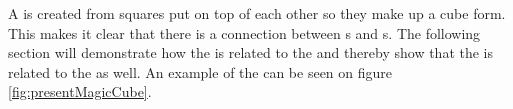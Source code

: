 \begin{comment}
The proof of this formula is quite straightforward. As table \ref{tab:magicSquareOrder3} illustrates, a \msquare{} of the order 3 contains the numbers from 1 to 9.

The sum of the numbers of a row in a \msquare{} is equal to the magic constant. If the magic constant is multiplied by the order $n$ it would be equal to the sum of all the integers, since each number only occurs once in a \msquare{}.

The equation \ref{proof:magicConstant1} can be rewritten into the equation \ref{proof:magicConstant2}(See proof of the right hand side transcription in appendix X).

\begin{align}
\label{proof:magicConstant1}
	n \cdot M \left( n \right) = \sum ^{n^2}_{i = 1} i = 1 + \cdots + n^2
\end{align}
\begin{align}
\label{proof:magicConstant2}
	n \cdot M \left( n \right) = \frac{n^2 \cdot \left( n^2 + 1 \right)}{2} \\
\label{proof:magicConstant3}
	M \left( n \right) = \frac{n \cdot \left( n^2 + 1 \right)}{2} 
\end{align}

The equation \ref{proof:magicConstant3} shows the function which gives the magic constant for a \msquare{} of the order $n$.
\end{comment}

A \mcube{} is created from squares put on top of each other so they make up a cube form. 
This makes it clear that there is a connection between \msquare{}s and \mcube{}s.
The following section will demonstrate how the \mcube{} is related to the \rubik{} and thereby show that the \msquare{} is related to the \rubik{} as well.
An example of the \mcube{} can be seen on figure \ref{fig:presentMagicCube}.

